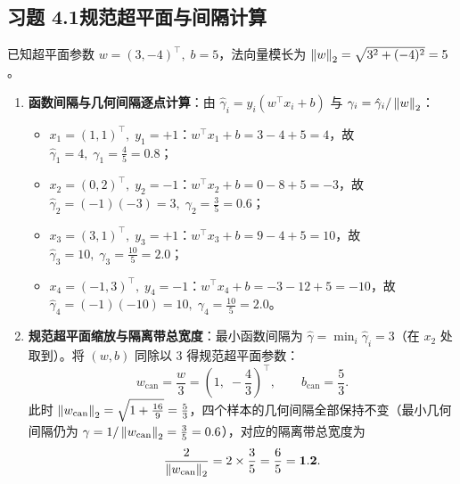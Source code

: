 \subsection*{习题 4.1\quad 规范超平面与间隔计算}
已知超平面参数 $w = (3, -4)^\top,\; b = 5$，法向量模长为 $\left\|w\right\|_2 = \sqrt{3^2 + (-4)^2} = 5$。
\begin{enumerate}[label=(\arabic*), leftmargin=1.8em]
  \item \textbf{函数间隔与几何间隔逐点计算}：由 $\hat{\gamma}_i = y_i(w^\top x_i + b)$ 与 $\gamma_i = \hat{\gamma}_i / \left\|w\right\|_2$：
  \begin{itemize}
    \item $x_1 = (1, 1)^\top,\; y_1 = +1$：$w^\top x_1 + b = 3 - 4 + 5 = 4$，故 $\hat{\gamma}_1 = 4,\; \gamma_1 = \frac{4}{5} = 0.8$；
    \item $x_2 = (0, 2)^\top,\; y_2 = -1$：$w^\top x_2 + b = 0 - 8 + 5 = -3$，故 $\hat{\gamma}_2 = (-1)(-3) = 3,\; \gamma_2 = \frac{3}{5} = 0.6$；
    \item $x_3 = (3, 1)^\top,\; y_3 = +1$：$w^\top x_3 + b = 9 - 4 + 5 = 10$，故 $\hat{\gamma}_3 = 10,\; \gamma_3 = \frac{10}{5} = 2.0$；
    \item $x_4 = (-1, 3)^\top,\; y_4 = -1$：$w^\top x_4 + b = -3 - 12 + 5 = -10$，故 $\hat{\gamma}_4 = (-1)(-10) = 10,\; \gamma_4 = \frac{10}{5} = 2.0$。
  \end{itemize}
  \item \textbf{规范超平面缩放与隔离带总宽度}：最小函数间隔为 $\hat{\gamma} = \min_i \hat{\gamma}_i = 3$（在 $x_2$ 处取到）。将 $(w, b)$ 同除以 $3$ 得规范超平面参数：
  \[
    w_{\mathrm{can}} = \frac{w}{3} = \left(1,\; -\frac{4}{3}\right)^\top, \qquad
    b_{\mathrm{can}} = \frac{5}{3}.
  \]
  此时 $\left\|w_{\mathrm{can}}\right\|_2 = \sqrt{1 + \frac{16}{9}} = \frac{5}{3}$，四个样本的几何间隔全部保持不变（最小几何间隔仍为 $\gamma = 1 / \left\|w_{\mathrm{can}}\right\|_2 = \frac{3}{5} = 0.6$），对应的隔离带总宽度为
  \[
    \frac{2}{\left\|w_{\mathrm{can}}\right\|_2} = 2 \times \frac{3}{5} = \frac{6}{5} = \mathbf{1.2}.
  \]
\end{enumerate}


